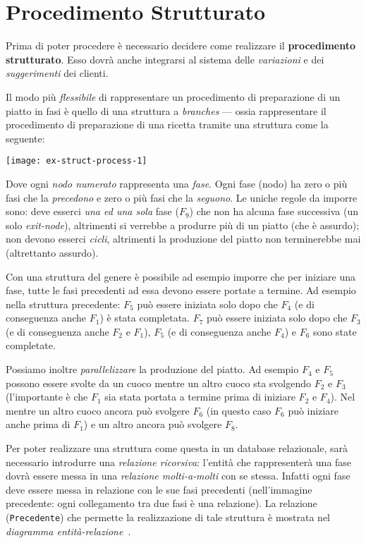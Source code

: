 \section{Procedimento Strutturato}\label{sec:structuredprocess}
Prima di poter procedere è necessario decidere come realizzare il {\bf procedimento strutturato}.
Esso dovrà anche integrarsi al sistema delle {\it variazioni} e dei {\it suggerimenti} dei clienti.

Il modo più {\it flessibile} di rappresentare un procedimento di preparazione di un piatto
in fasi è quello di una struttura a {\it branches} --- ossia rappresentare il procedimento
di preparazione di una ricetta tramite una struttura come la seguente:

\vspace{5pt}\centerline{\texttt{[image: ex-struct-process-1]}}

\vspace{15pt}

Dove ogni {\it nodo numerato} rappresenta una {\it fase}. Ogni fase (nodo) ha zero o più fasi
che la {\it precedono} e zero o più fasi che la {\it seguono}. Le uniche regole da imporre
sono: deve esserci {\it una ed una sola} fase ($F_{9}$) che non ha alcuna fase successiva (un
solo {\it exit-node}), altrimenti si verrebbe a produrre più di un piatto (che è assurdo); non
devono esserci {\it cicli}, altrimenti la produzione del piatto non terminerebbe mai (altrettanto assurdo).

Con una struttura del genere è possibile ad esempio imporre che per iniziare una fase,
tutte le fasi precedenti ad essa devono essere portate a termine. Ad esempio nella struttura precedente:
$F_{5}$ può essere iniziata solo dopo che $F_{4}$ (e di conseguenza anche $F_{1}$) è stata completata.
$F_{7}$ può essere iniziata solo dopo che $F_{3}$ (e di conseguenza anche $F_{2}$ e $F_{1}$),
$F_{5}$ (e di conseguenza anche $F_{4}$) e $F_{6}$ sono state completate.

Possiamo inoltre {\it parallelizzare} la produzione del piatto. Ad esempio $F_{4}$ e $F_{5}$ possono essere
svolte da un cuoco mentre un altro cuoco sta svolgendo $F_{2}$ e $F_{3}$ (l'importante è che
$F_{1}$ sia stata portata a termine prima di iniziare $F_{2}$ e $F_{4}$). Nel mentre un altro
cuoco ancora può svolgere $F_{6}$ (in questo caso $F_{6}$ può iniziare anche prima di $F_{1}$)
e un altro ancora può svolgere $F_{8}$.

Per poter realizzare una struttura come questa in un database relazionale, sarà necessario
introdurre una {\it relazione ricorsiva}: l'entità che rappresenterà una fase dovrà essere
messa in una {\it relazione molti-a-molti} con se stessa. Infatti ogni fase deve essere
messa in relazione con le sue fasi precedenti (nell'immagine precedente: ogni collegamento
tra due fasi è una relazione).
La relazione ({\tt Precedente}) che permette la realizzazione di tale struttura è mostrata
nel {\it diagramma entità-relazione}~.

%

